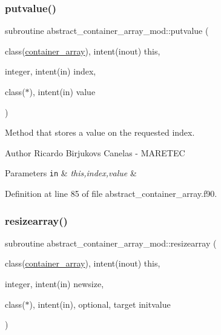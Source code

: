 \subsubsection{\texorpdfstring{putvalue()}{putvalue()}}
{\footnotesize\ttfamily subroutine abstract\+\_\+container\+\_\+array\+\_\+mod\+::putvalue (\begin{DoxyParamCaption}\item[{class(\mbox{\hyperlink{structabstract__container__array__mod_1_1container__array}{container\+\_\+array}}), intent(inout)}]{this,  }\item[{integer, intent(in)}]{index,  }\item[{class($\ast$), intent(in)}]{value }\end{DoxyParamCaption})\hspace{0.3cm}{\ttfamily [private]}}



Method that stores a value on the requested index. 

\begin{DoxyAuthor}{Author}
Ricardo Birjukovs Canelas -\/ M\+A\+R\+E\+T\+EC 
\end{DoxyAuthor}

\begin{DoxyParams}[1]{Parameters}
\mbox{\tt in}  & {\em this,index,value} & \\
\hline
\end{DoxyParams}


Definition at line 85 of file abstract\+\_\+container\+\_\+array.\+f90.

\mbox{\label{namespaceabstract__container__array__mod_adb5b2e1692fa90a0239e9a0bcdc7967d}} 
\subsubsection{\texorpdfstring{resizearray()}{resizearray()}}
{\footnotesize\ttfamily subroutine abstract\+\_\+container\+\_\+array\+\_\+mod\+::resizearray (\begin{DoxyParamCaption}\item[{class(\mbox{\hyperlink{structabstract__container__array__mod_1_1container__array}{container\+\_\+array}}), intent(inout)}]{this,  }\item[{integer, intent(in)}]{newsize,  }\item[{class($\ast$), intent(in), optional, target}]{initvalue }\end{DoxyParamCaption})\hspace{0.3cm}{\ttfamily [private]}}



